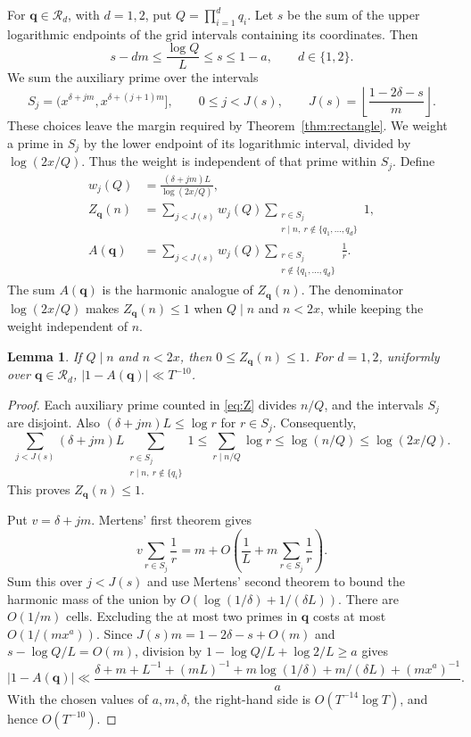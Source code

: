 \documentclass[10pt]{article}
\newtheorem{lem}[thm]{Lemma}
\newcommand{\calR}{\mathcal R}
\begin{document}
For $\mathbf q\in\calR_d$, with $d=1,2$, put $Q=\prod_{i=1}^d q_i$. Let $s$ be the sum of the upper logarithmic endpoints of the grid intervals containing its coordinates. Then
\[
 s-dm\leq\frac{\log Q}{L}\leq s\leq1-a,
 \qquad d\in\{1,2\}.
\]
We sum the auxiliary prime over the intervals
\[
 S_j=(x^{\delta+jm},x^{\delta+(j+1)m}],\qquad
 0\leq j<J(s),\qquad
 J(s)=\left\lfloor\frac{1-2\delta-s}{m}\right\rfloor.
\]
These choices leave the margin required by Theorem~\ref{thm:rectangle}. We weight a prime in $S_j$ by the lower endpoint of its logarithmic interval, divided by $\log(2x/Q)$. Thus the weight is independent of that prime within $S_j$. Define
\begin{align}
 w_j(Q)&=\frac{(\delta+jm)L}{\log(2x/Q)},\label{eq:w}\\
 Z_{\mathbf q}(n)&=\sum_{j<J(s)}w_j(Q)
      \sum_{\substack{r\in S_j\\r\mid n,\ r\notin\{q_1,\ldots,q_d\}}}1,
      \label{eq:Z}\\
 A(\mathbf q)&=\sum_{j<J(s)}w_j(Q)
      \sum_{\substack{r\in S_j\\r\notin\{q_1,\ldots,q_d\}}}\frac1r.
      \label{eq:Zmodel}
\end{align}
The sum $A(\mathbf q)$ is the harmonic analogue of $Z_{\mathbf q}(n)$. The denominator $\log(2x/Q)$ makes $Z_{\mathbf q}(n)\leq1$ when $Q\mid n$ and $n<2x$, while keeping the weight independent of $n$.

\begin{lem}\label{lem:defect}
If $Q\mid n$ and $n<2x$, then $0\leq Z_{\mathbf q}(n)\leq1$. For $d=1,2$, uniformly over $\mathbf q\in\calR_d$, $|1-A(\mathbf q)|\ll T^{-10}$.
\end{lem}
\begin{proof}
Each auxiliary prime counted in \eqref{eq:Z} divides $n/Q$, and the intervals $S_j$ are disjoint. Also $(\delta+jm)L\leq\log r$ for $r\in S_j$. Consequently,
\[
 \sum_{j<J(s)}(\delta+jm)L
   \sum_{\substack{r\in S_j\\r\mid n,\ r\notin\{q_i\}}}1
 \leq\sum_{r\mid n/Q}\log r
 \leq\log(n/Q)\leq\log(2x/Q).
\]
This proves $Z_{\mathbf q}(n)\leq1$.

Put $v=\delta+jm$. Mertens' first theorem gives
\[
 v\sum_{r\in S_j}\frac1r
 =m+O\left(\frac1L+m\sum_{r\in S_j}\frac1r\right).
\]
Sum this over $j<J(s)$ and use Mertens' second theorem to bound the harmonic mass of the union by $O(\log(1/\delta)+1/(\delta L))$. There are $O(1/m)$ cells. Excluding the at most two primes in $\mathbf q$ costs at most $O(1/(mx^a))$. Since $J(s)m=1-2\delta-s+O(m)$ and $s-\log Q/L=O(m)$, division by $1-\log Q/L+\log2/L\geq a$ gives
\begin{equation}\label{eq:defect-bound}
 |1-A(\mathbf q)|\ll
 \frac{\delta+m+L^{-1}+(mL)^{-1}
       +m\log(1/\delta)+m/(\delta L)+(mx^a)^{-1}}a.
\end{equation}
With the chosen values of $a,m,\delta$, the right-hand side is $O(T^{-14}\log T)$, and hence $O(T^{-10})$.
\end{proof}
\end{document}
